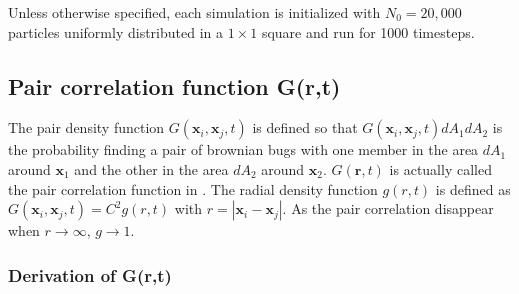 Unless otherwise specified, each simulation is initialized with $N_0=20,000$ particles uniformly distributed in a $1\times 1$ square and run for 1000 timesteps. 
 
% 
% 
% 
\subsection*{Pair correlation function G(r,t)}

The pair density function $G(\boldsymbol{x}_i,\boldsymbol{x}_j,t)$ is defined so that $G(\boldsymbol{x}_i,\boldsymbol{x}_j,t)dA_1dA_2$ is the probability finding a pair of brownian bugs with one member in the area $dA_1$ around $\boldsymbol{x}_1$ and the other in the area $dA_2$ around $\boldsymbol{x}_2$. $G(\boldsymbol{r},t)$ is actually called the pair correlation function in \cite{young_reproductive_2001}. The radial density function $g(r,t)$ is defined as $G(\boldsymbol{x}_i,\boldsymbol{x}_j,t)=C^2g(r,t)$ with $r=|\boldsymbol{x}_i-\boldsymbol{x}_j|$. As the pair correlation disappear when $r\rightarrow\infty$, $g\rightarrow 1$.  

\subsubsection*{Derivation of G(r,t)}

